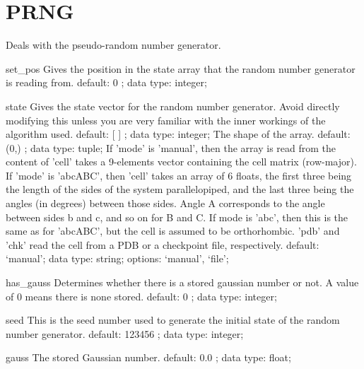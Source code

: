 \section{PRNG}
\label{PRNG}
\begin{ipifield}{}%
{Deals with the pseudo-random number generator.}%
{}%
{}
\begin{ipifield}{set\_pos}%
{Gives the position in the state array that the random number generator is reading from.}%
{default:  0 ; data type: integer; }%
{}
\end{ipifield}
\begin{ipifield}{state}%
{Gives the state vector for the random number generator. Avoid directly modifying this unless you are very familiar with the inner workings of the algorithm used.}%
{default:  [ ] ; data type: integer; }%
{%
{The shape of the array.}%
{default:  (0,) ; data type: tuple; }%
%
{If 'mode' is 'manual', then the array is read from the content of 'cell' takes a 9-elements vector containing the cell matrix (row-major). If 'mode' is 'abcABC', then 'cell' takes an array of 6 floats, the first three being the length of the sides of the system parallelopiped, and the last three being the angles (in degrees) between those sides. Angle A corresponds to the angle between sides b and c, and so on for B and C. If mode is 'abc', then this is the same as for 'abcABC', but the cell is assumed to be orthorhombic. 'pdb' and 'chk' read the cell from a PDB or a checkpoint file, respectively.}%
{default: `manual'; data type: string; options: `manual', `file'; }%
}
\end{ipifield}
\begin{ipifield}{has\_gauss}%
{Determines whether there is a stored gaussian number or not. A value of 0 means there is none stored.}%
{default:  0 ; data type: integer; }%
{}
\end{ipifield}
\begin{ipifield}{seed}%
{This is the seed number used to generate the initial state of the random number generator.}%
{default:  123456 ; data type: integer; }%
{}
\end{ipifield}
\begin{ipifield}{gauss}%
{The stored Gaussian number.}%
{default:  0.0 ; data type: float; }%
{}
\end{ipifield}
\end{ipifield}
